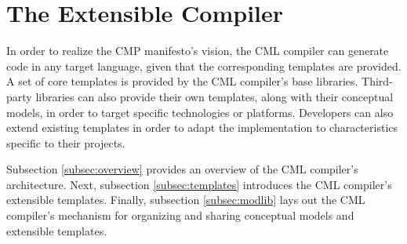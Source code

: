 \section{The Extensible Compiler}\label{sec:compiler}

In order to realize the CMP \cite{cmp} manifesto's vision,
the CML compiler can generate code in any target language,
given that the corresponding templates are provided.
A set of core templates is provided by the CML compiler's base libraries.
Third-party libraries can also provide their own templates,
along with their conceptual models,
in order to target specific technologies or platforms.
Developers can also extend existing templates in order to adapt the implementation to characteristics specific to their projects.

Subsection \ref{subsec:overview} provides an overview of the CML compiler's architecture.
Next, subsection \ref{subsec:templates} introduces the CML compiler's extensible templates.
Finally, subsection \ref{subsec:modlib} lays out the CML compiler's mechanism for organizing and sharing conceptual models and extensible templates.




